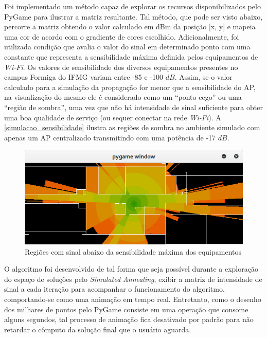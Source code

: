 \documentclass[
	12pt,				%
	twoside,			%
	a4paper,			%
	english,			%
	french,				%
	spanish,			%
	brazil				%
	]{abntex2}
\begin{document}
Foi implementado um método capaz de explorar os recursos
disponibilizados pelo PyGame para ilustrar a matriz resultante. Tal
método, que pode ser visto abaixo, percorre a matriz obtendo o valor
calculado em dBm da posição {[}x, y{]} e mapeia uma cor de acordo com o
gradiente de cores escolhido. Adicionalmente, foi utilizada condição que
avalia o valor do sinal em determinado ponto com uma constante que
representa a sensibilidade máxima definida pelos equipamentos de
\emph{Wi-Fi}. Os valores de sensibilidade dos diversos equipamentos
presentes no campus Formiga do IFMG variam entre -85 e -100 \(dB\).
Assim, se o valor calculado para a simulação da propagação for menor que
a sensibilidade do AP, na visualização do mesmo ele é considerado como
um ``ponto cego'' ou uma ``região de sombra'', uma vez que não há
intensidade de sinal suficiente para obter uma boa qualidade de serviço
(ou sequer conectar na rede \emph{Wi-Fi}). A
\autoref{simulacao_sensibilidade} ilustra as regiões de sombra no
ambiente simulado com apenas um AP centralizado transmitindo com uma
potência de -17 \(dB\).

\begin{figure}[ht]
    \caption{\label{simulacao_sensibilidade} Regiões com sinal abaixo da sensibilidade máxima dos equipamentos}
    \begin{center}
        \includegraphics[scale=0.7]{imagens/sumulacao-sensibilidade.jpg}
    \end{center}
\end{figure}

O algoritmo foi desenvolvido de tal forma que seja possível durante a
exploração do espaço de soluções pelo \emph{Simulated Annealing}, exibir
a matriz de intensidade de sinal a cada iteração para acompanhar o
funcionamento do algoritmo, comportando-se como uma animação em tempo
real. Entretanto, como o desenho dos milhares de pontos pelo PyGame
consiste em uma operação que consome alguns segundos, tal processo de
animação fica desativado por padrão para não retardar o cômputo da
solução final que o usuário aguarda.
\end{document}
